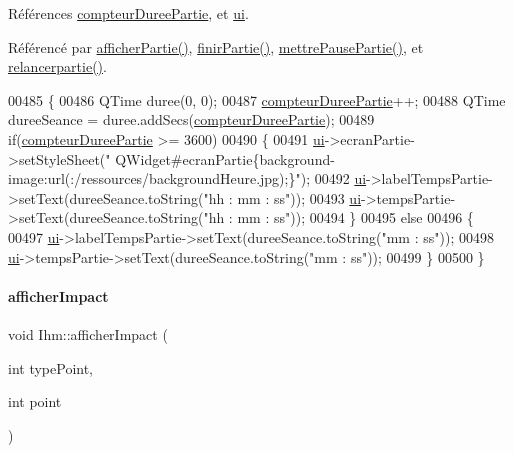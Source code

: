 Références \hyperlink{ihm_8h_source_l00058}{compteur\+Duree\+Partie}, et \hyperlink{ihm_8h_source_l00052}{ui}.



Référencé par \hyperlink{ihm_8cpp_source_l00333}{afficher\+Partie()}, \hyperlink{ihm_8cpp_source_l00365}{finir\+Partie()}, \hyperlink{ihm_8cpp_source_l00519}{mettre\+Pause\+Partie()}, et \hyperlink{ihm_8cpp_source_l00539}{relancerpartie()}.


\begin{DoxyCode}
00485 \{
00486     QTime duree(0, 0);
00487     \hyperlink{class_ihm_a61e4a83f8ca0f177971af808e51be5bb}{compteurDureePartie}++;
00488     QTime dureeSeance = duree.addSecs(\hyperlink{class_ihm_a61e4a83f8ca0f177971af808e51be5bb}{compteurDureePartie});
00489     \textcolor{keywordflow}{if}(\hyperlink{class_ihm_a61e4a83f8ca0f177971af808e51be5bb}{compteurDureePartie} >= 3600)
00490     \{
00491         \hyperlink{class_ihm_a0ac5f47856566ceeeca1720109bf70ea}{ui}->ecranPartie->setStyleSheet(\textcolor{stringliteral}{"
      QWidget#ecranPartie\{background-image:url(:/ressources/backgroundHeure.jpg);\}"});
00492         \hyperlink{class_ihm_a0ac5f47856566ceeeca1720109bf70ea}{ui}->labelTempsPartie->setText(dureeSeance.toString(\textcolor{stringliteral}{"hh : mm : ss"}));
00493         \hyperlink{class_ihm_a0ac5f47856566ceeeca1720109bf70ea}{ui}->tempsPartie->setText(dureeSeance.toString(\textcolor{stringliteral}{"hh : mm : ss"}));
00494     \}
00495     \textcolor{keywordflow}{else}
00496     \{
00497         \hyperlink{class_ihm_a0ac5f47856566ceeeca1720109bf70ea}{ui}->labelTempsPartie->setText(dureeSeance.toString(\textcolor{stringliteral}{"mm : ss"}));
00498         \hyperlink{class_ihm_a0ac5f47856566ceeeca1720109bf70ea}{ui}->tempsPartie->setText(dureeSeance.toString(\textcolor{stringliteral}{"mm : ss"}));
00499     \}
00500 \}
\end{DoxyCode}
\mbox{\label{class_ihm_a591e686d87b027ac16e91b3b9867a58a}} 
\paragraph{\texorpdfstring{afficher\+Impact}{afficherImpact}}
{\footnotesize\ttfamily void Ihm\+::afficher\+Impact (\begin{DoxyParamCaption}\item[{int}]{type\+Point,  }\item[{int}]{point }\end{DoxyParamCaption})\hspace{0.3cm}{\ttfamily [slot]}}




